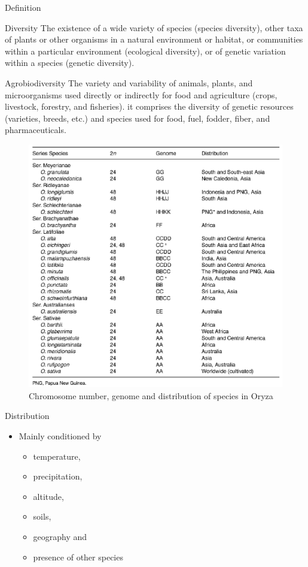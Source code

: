 \documentclass[ignorenonframetext,aspectratio=169]{beamer}
\providecommand{\tightlist}{%
  \setlength{\itemsep}{0pt}\setlength{\parskip}{0pt}}
\begin{document}
\begin{frame}{Definition}
\protect\hypertarget{definition}{}

\begin{block}{Diversity}
The existence of a wide variety of species (species diversity), other taxa of plants or other organisms in a natural environment or habitat, or communities within a particular environment (ecological diversity), or of genetic variation within a species (genetic diversity).
\end{block}

\begin{block}{Agrobiodiversity}
The variety and variability of animals, plants, and microorganisms used directly or indirectly for food and agriculture (crops, livestock, forestry, and fisheries). it comprises the diversity of genetic resources (varieties, breeds, etc.) and species used for food, fuel, fodder, fiber, and pharmaceuticals.
\end{block}

\end{frame}

\begin{frame}{}
\protect\hypertarget{section-2}{}

\begin{figure}
\includegraphics[width=0.5\linewidth]{./../images/oryza_distribution_chromosome} \caption{Chromosome number, genome and distribution of species in Oryza}\label{fig:chromosome-distribution-oryza}
\end{figure}

\end{frame}

\begin{frame}{Distribution}
\protect\hypertarget{distribution}{}

\begin{itemize}
\tightlist
\item
  Mainly conditioned by

  \begin{itemize}
  \tightlist
  \item
    temperature,
  \item
    precipitation,
  \item
    altitude,
  \item
    soils,
  \item
    geography and
  \item
    presence of other species
  \end{itemize}
\end{itemize}

\end{frame}
\end{document}
